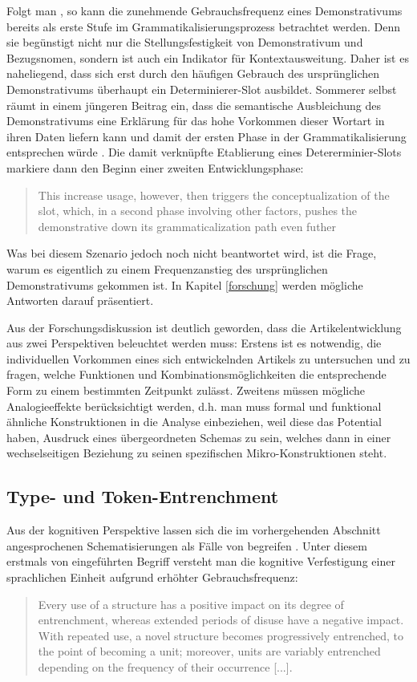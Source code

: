 Folgt man \textcite[s.][194]{Himmelmann1997}, so kann die zunehmende Gebrauchsfrequenz eines Demonstrativums bereits als erste Stufe im Grammatikalisierungsprozess betrachtet werden. Denn sie begünstigt nicht nur die Stellungsfestigkeit von Demonstrativum und Bezugsnomen, sondern ist auch ein Indikator für Kontextausweitung. Daher ist es naheliegend, dass sich erst durch den häufigen Gebrauch des ursprünglichen Demonstrativums überhaupt  ein Determinierer-Slot ausbildet. Sommerer selbst räumt in einem jüngeren Beitrag ein, dass die semantische Ausbleichung des Demonstrativums eine Erklärung für das hohe Vorkommen dieser Wortart in ihren Daten liefern kann und damit der ersten Phase in der Grammatikalisierung entsprechen würde \parencite[127]{Sommerer2015}. Die damit verknüpfte Etablierung eines Detererminier-Slots markiere dann den Beginn einer zweiten Entwicklungsphase: \blockcquote[127]{Sommerer2015}{This increase usage, however, then triggers the conceptualization of the slot, which, in a second phase involving other factors, pushes the demonstrative down its grammaticalization path even futher}. 
Was bei diesem Szenario jedoch noch nicht beantwortet wird, ist die Frage, warum es eigentlich zu einem Frequenzanstieg des ursprünglichen Demonstrativums gekommen ist. In Kapitel \ref{forschung} werden mögliche Antworten darauf präsentiert. 


Aus der Forschungsdiskussion ist deutlich geworden, dass die Artikelentwicklung aus zwei Perspektiven beleuchtet werden muss:  Erstens ist es notwendig, die individuellen Vorkommen eines sich entwickelnden Artikels zu untersuchen und zu fragen, welche Funktionen und Kombinationsmöglichkeiten die entsprechende Form zu einem bestimmten Zeitpunkt zulässt. Zweitens müssen mögliche Analogieeffekte berücksichtigt werden, d.h. man muss formal und funktional ähnliche Konstruktionen in die Analyse einbeziehen, weil diese das Potential haben, Ausdruck eines übergeordneten Schemas zu sein, welches dann in einer wechselseitigen Beziehung zu seinen spezifischen Mikro-Konstruktionen steht. 

\subsection{Type- und Token-Entrenchment}\label{sec:entrenchment}

Aus der kognitiven Perspektive lassen sich die im vorhergehenden Abschnitt angesprochenen Schematisierungen als Fälle von  begreifen \parencite[s. u.a.][]{Langacker1987, Langacker2008,Goldberg1995,Goldberg2006,Bybee2006,Bybee2010, Schmid2007,Schmid2016}. 
Unter diesem erstmals von \textcite{Langacker1987} eingeführten Begriff versteht man die kognitive Verfestigung einer sprachlichen Einheit aufgrund erhöhter Gebrauchsfrequenz: \blockcquote[59]{Langacker1987}{Every use of a structure has a positive impact on its degree of entrenchment, whereas extended periods of disuse have a negative impact. With repeated use, a novel structure becomes progressively entrenched, to the point of becoming a unit; moreover, units are variably entrenched depending on the frequency of their occurrence [...].} 


